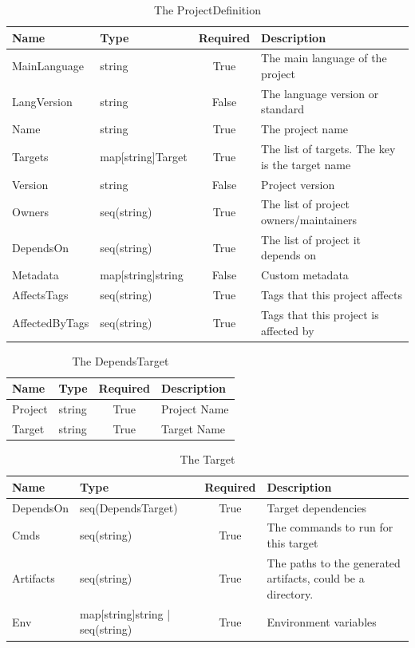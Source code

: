 \documentclass[11pt]{article}
\begin{document}
\begin{table}[h!]
  \centering
  \begin{tabular}[h!]{l | l | c | l}
    \textbf{Name} & \textbf{Type} & \textbf{Required} & \textbf{Description}\\
    \hline
    MainLanguage & string & True & The main language of the project\\
    \hline
    LangVersion & string & False & The language version or standard\\
    \hline
    Name & string & True & The project name\\
    \hline
    Targets & map[string]Target & True & The list of \glspl{target}. The key is
                                         the target name\\
    \hline
    Version & string & False & Project version\\
    \hline
    Owners & seq(string) & True & The list of project owners/maintainers\\
    \hline
    DependsOn & seq(string) & True & The list of project it depends on\\
    \hline
    Metadata & map[string]string & False & Custom metadata\\
    \hline
    AffectsTags & seq(string) & True & Tags that this project affects\\
    \hline
    AffectedByTags & seq(string) & True & Tags that this project is affected by
  \end{tabular}
  \caption{The ProjectDefinition}
  \label{table:proj_def}
\end{table}

\begin{table}[h!]
  \centering
  \begin{tabular}[h!]{l | p{3cm} | c | p{7cm}}
    \textbf{Name} & \textbf{Type} & \textbf{Required} & \textbf{Description}\\
    \hline
    Project & string & True & Project Name\\
    \hline
    Target & string & True & Target Name\\
  \end{tabular}
  \caption{The DependsTarget}
  \label{table:dependstARGET}
\end{table}

\begin{table}[h!]
  \centering
  \begin{tabular}[h!]{l | p{3.5cm} | c | p{7cm}}
    \textbf{Name} & \textbf{Type} & \textbf{Required} & \textbf{Description}\\
    \hline
    DependsOn & seq(DependsTarget) & True & Target dependencies\\
    \hline
    Cmds & seq(string) & True & The commands to run for this target\\
    \hline
    Artifacts & seq(string) & True & The paths to the generated artifacts, could
                                     be a directory.\\
    \hline
    Env & map[string]string | seq(string) & True & Environment variables
  \end{tabular}
  \caption{The Target}
  \label{table:target}
\end{table}
\end{document}
